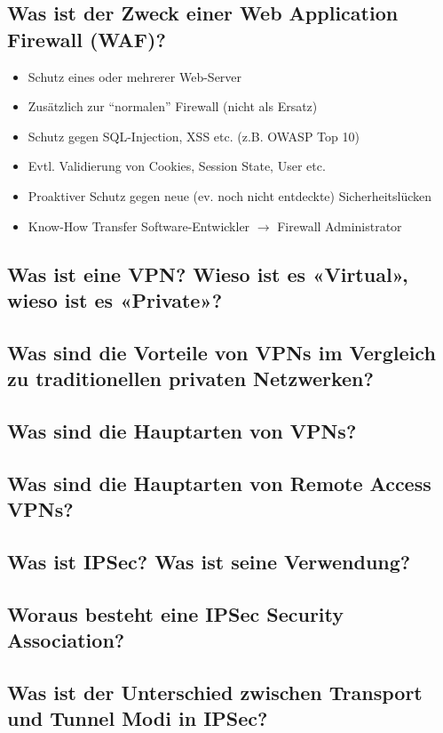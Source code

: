 \subsection*{Was ist der Zweck einer Web Application Firewall (WAF)?}
\begin{itemize}
    \item Schutz eines oder mehrerer Web-Server
    \item Zusätzlich zur "`normalen"' Firewall (nicht als Ersatz)
    \item Schutz gegen SQL-Injection, XSS etc. (z.B. OWASP Top 10)
    \item Evtl. Validierung von Cookies, Session State, User etc.
    \item Proaktiver Schutz gegen neue (ev. noch nicht entdeckte) Sicherheitslücken
    \item Know-How Transfer Software-Entwickler $\rightarrow$ Firewall Administrator
\end{itemize}

\subsection*{Was ist eine VPN? Wieso ist es «Virtual», wieso ist es «Private»?}
\subsection*{Was sind die Vorteile von VPNs im Vergleich zu traditionellen privaten Netzwerken?}
\subsection*{Was sind die Hauptarten von VPNs?}
\subsection*{Was sind die Hauptarten von Remote Access VPNs?}
\subsection*{Was ist IPSec? Was ist seine Verwendung?}
\subsection*{Woraus besteht eine IPSec Security Association?}
\subsection*{Was ist der Unterschied zwischen Transport und Tunnel Modi in IPSec?}